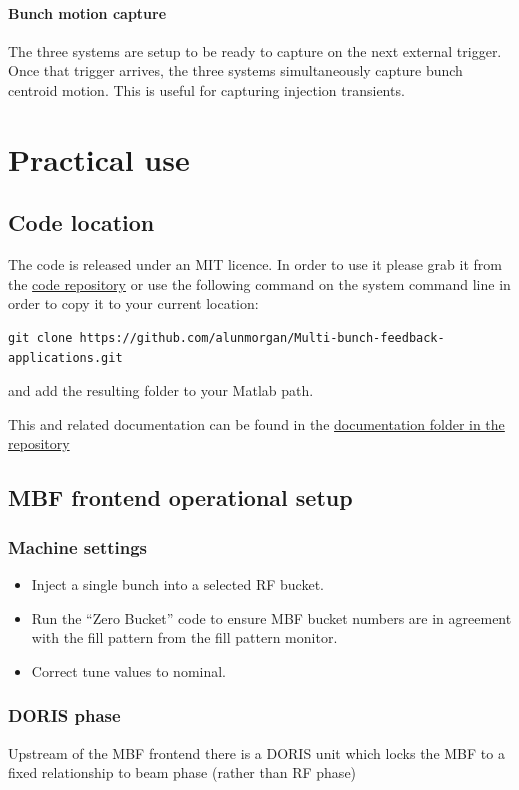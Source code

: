 \documentclass{report}
\begin{document}
\subsubsection{Bunch motion capture}
The three systems are setup to be ready to capture on the next external trigger. Once that trigger arrives, the three systems simultaneously capture bunch centroid motion. This is useful for capturing injection transients. 

\chapter{Practical use}
\section{Code location }
The code is released under an MIT licence. In order to use it please grab it from the \href{https://github.com/alunmorgan/Multi-bunch-feedback-applications}{code repository}
or use the following command on the system command line in order to copy it to your current location:
\begin{verbatim}
git clone https://github.com/alunmorgan/Multi-bunch-feedback-applications.git
\end{verbatim}
and add the resulting folder to your Matlab path. 

This and related documentation can be found in the \href{https://github.com/alunmorgan/Multi-bunch-feedback-applications/Documentation}{documentation folder in the repository}

 \section{MBF frontend operational setup}

\subsection{Machine settings}
\begin{itemize}
    \item {Inject a single bunch into a selected RF bucket.}
    \item{Run the “Zero Bucket” code to ensure MBF bucket numbers are in agreement with the fill pattern from the fill pattern monitor. }
    \item{Correct tune values to nominal.}
\end{itemize}

\clearpage
\subsection{DORIS phase}
Upstream of the MBF frontend there is a DORIS unit which locks the MBF to a fixed relationship to beam phase (rather than RF phase) 
\end{document}
